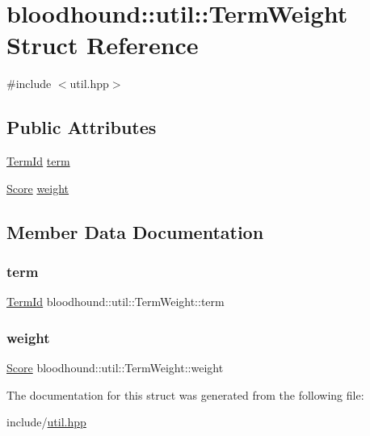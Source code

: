 \hypertarget{structbloodhound_1_1util_1_1TermWeight}{}\section{bloodhound\+:\+:util\+:\+:Term\+Weight Struct Reference}
\label{structbloodhound_1_1util_1_1TermWeight}


{\ttfamily \#include $<$util.\+hpp$>$}

\subsection*{Public Attributes}
\begin{DoxyCompactItemize}
\item 
\hyperlink{structbloodhound_1_1TermId}{Term\+Id} \hyperlink{structbloodhound_1_1util_1_1TermWeight_a34312a966e1ecf1bd58c8c231441e0d4}{term}
\item 
\hyperlink{structbloodhound_1_1Score}{Score} \hyperlink{structbloodhound_1_1util_1_1TermWeight_a23e46817ce94a7100e5c470b797dd568}{weight}
\end{DoxyCompactItemize}


\subsection{Member Data Documentation}
\mbox{\label{structbloodhound_1_1util_1_1TermWeight_a34312a966e1ecf1bd58c8c231441e0d4}} 
\subsubsection{\texorpdfstring{term}{term}}
{\footnotesize\ttfamily \hyperlink{structbloodhound_1_1TermId}{Term\+Id} bloodhound\+::util\+::\+Term\+Weight\+::term}

\mbox{\label{structbloodhound_1_1util_1_1TermWeight_a23e46817ce94a7100e5c470b797dd568}} 
\subsubsection{\texorpdfstring{weight}{weight}}
{\footnotesize\ttfamily \hyperlink{structbloodhound_1_1Score}{Score} bloodhound\+::util\+::\+Term\+Weight\+::weight}



The documentation for this struct was generated from the following file\+:\begin{DoxyCompactItemize}
\item 
include/\hyperlink{util_8hpp}{util.\+hpp}\end{DoxyCompactItemize}
